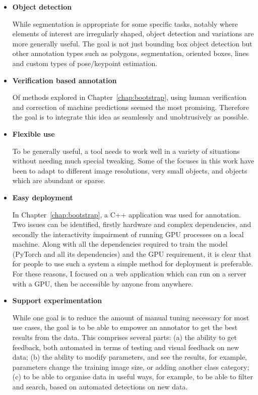 \begin{itemize}

\item {\bf Object detection} \par
While segmentation is appropriate for some specific tasks, notably where elements of interest are irregularly shaped, object detection and variations are more generally useful. The goal is not just bounding box object detection but other annotation types such as polygons, segmentation, oriented boxes, lines and custom types of pose/keypoint estimation.

\item {\bf Verification based annotation} \par
Of methods explored in Chapter~\ref{chap:bootstrap}, using human verification and correction of machine predictions seemed the most promising. Therefore the goal is to integrate this idea as seamlessly and unobtrusively as possible. 

\item {\bf Flexible use} \par
To be generally useful, a tool needs to work well in a variety of situations without needing much special tweaking. Some of the focuses in this work have been to adapt to different image resolutions, very small objects, and objects which are abundant or sparse. 

\item {\bf Easy deployment} \par
In Chapter~\ref{chap:bootstrap}, a C++ application was used for annotation. Two issues can be identified, firstly hardware and complex dependencies, and secondly the interactivity impairment of running GPU processes on a local machine. Along with all the dependencies required to train the model (PyTorch \cite{Paszke2017} and all its dependencies) and the \gls{GPU} requirement, it is clear that for people to use such a system a simple method for deployment is preferable. For these reasons, I focused on a web application which can run on a server with a GPU, then be accessible by anyone from anywhere.

\item {\bf Support experimentation} \par
While one goal is to reduce the amount of manual tuning necessary for most use cases, the goal is to be able to empower an annotator to get the best results from the data. This comprises  several parts: (a) the ability to get feedback, both automated in terms of testing and visual feedback on new data; (b) the ability to modify parameters, and see the results, for example, parameters change the training image size, or adding another class category; (c) to be able to organise data in useful ways, for example, to be able to filter and search, based on automated detections on new data.

\end{itemize}


